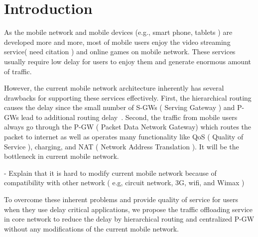 \section{Introduction}

As the mobile network and mobile devices (e.g., smart phone, tablets ) are developed more and more, most of mobile users enjoy the video streaming service( need citation ) and online games on mobile network.  These services usually require low delay for users to enjoy them and generate enormous amount of traffic.

However, the current mobile network architecture inherently has several drawbacks for supporting these services effectively.  First, the hierarchical routing causes the delay since the small number of S-GWs ( Serving Gateway ) and P-GWs lead to additional routing delay~\cite{banerjee2013moca,dong20113g}.  Second, the traffic from mobile users always go through the P-GW ( Packet Data Network Gateway) which routes the packet to internet as well as operates many functionality like QoS ( Quality of Service ), charging, and NAT ( Network Address Translation ).  It will be the bottleneck in current mobile network. 


- Explain that it is hard to modify current mobile network because of compatibility with other network ( e.g, circuit network, 3G, wifi, and Wimax )

To overcome these inherent problems and provide quality of service for users when they use delay critical applications, we propose the traffic offloading service in core network to reduce the delay by hierarchical routing and centralized P-GW without any modifications of the current mobile network.




















